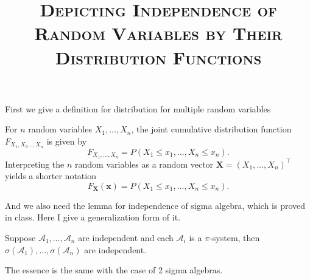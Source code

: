 
\linespread{1.5} \selectfont
\title{\textsc{Depicting Independence of Random Variables by Their Distribution Functions} }

\maketitle
First we give a definition for distribution for multiple random variables
\begin{defi}
		For $n$ random variables $X_1,\ldots,X_{n}$, the joint cumulative distribution function $F_{X_1,X_2\ldots,X_{n}}$ is given by
		\[
				F_{X_1,\ldots,X_{n}} = P\left( X_1\le x_1,\ldots,
				X_{n} \le  x_{n}\right) 
		.\] 
		Interpreting the $n$ random variables as a random vector 
		$\bm{X} = \left( X_1,\ldots,X_{n} \right) ^{\top }$ yields a shorter
		notation 
		\[
				F_{\bm{X}}\left( \bm{x} \right)  = 
				P\left( X_1\le x_1,\ldots,X_{n}\le x_{n} \right) 
		.\] 
\end{defi}
And we also need the lemma for independence of sigma algebra, which is proved 
in class. Here I give a generalization form of it.
\begin{lemma}
		Suppose $\mathcal{A}_{1}, \ldots, \mathcal{A}_{n}$ are independent 
		and each $\mathcal{A}_{i}$ is a $\pi$-system, then 
		$\sigma\left( \mathcal{A}_{1} \right) , \ldots, 
		\sigma\left( \mathcal{A}_{n} \right) $ are independent.
\end{lemma}
		The essence is the same with the case of 2 sigma algebras.


